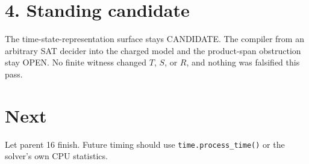 \documentclass[11pt]{article}
\begin{document}
\section*{4. Standing candidate}
The time-state-representation surface stays CANDIDATE. The compiler from an arbitrary SAT decider into the charged model and the product-span obstruction stay OPEN. No finite witness changed $T$, $S$, or $R$, and nothing was falsified this pass.

\section*{Next}
Let parent 16 finish. Future timing should use \texttt{time.process\_time()} or the solver's own CPU statistics.
\end{document}
